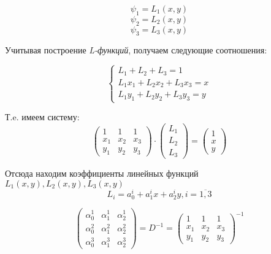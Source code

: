 \documentclass[12pt,a4paper]{article}
\begin{document}
\[ \psi_1 = L_1(x,y) \]
\[ \psi_2 = L_2(x,y) \]
\[ \psi_3 = L_3(x,y) \]
\newpage

\noindent Учитывая построение \textit{L-функций},
получаем следующие соотношения:

\begin{equation*}
    \begin{cases}
        L_1 + L_2 + L_3 = 1          \\
        L_1x_1 + L_2x_2 + L_3x_3 = x \\
        L_1y_1 + L_2y_2 + L_3y_3 = y
    \end{cases}
\end{equation*}

\noindent Т.e. имеем систему:
\renewcommand{\arraystretch}{1.25}
\begin{equation*}
    \begin{pmatrix}
        1   & 1   & 1   \\
        x_1 & x_2 & x_3 \\
        y_1 & y_2 & y_3
    \end{pmatrix}
    \cdot
    \begin{pmatrix}
        L_1 \\
        L_2 \\
        L_3
    \end{pmatrix}
    =
    \begin{pmatrix}
        1 \\
        x \\
        y
    \end{pmatrix}
\end{equation*}
\renewcommand{\arraystretch}{1.0}

\noindent Отсюда находим коэффициенты
линейных функций $L_1(x,y), L_2(x,y), L_3(x,y)$
\[ L_i = a_0^i + a_1^ix + a_2^iy, i = \overline{1,3} \]

\renewcommand{\arraystretch}{1.25}
\begin{equation*}
    \begin{pmatrix}
        \alpha_0^1 & \alpha_1^1 & \alpha_2^1 \\
        \alpha_0^2 & \alpha_1^2 & \alpha_2^2 \\
        \alpha_0^3 & \alpha_1^3 & \alpha_2^3
    \end{pmatrix}
    =
    D^{-1}
    =
    {\begin{pmatrix}
        1   & 1   & 1   \\
        x_1 & x_2 & x_3 \\
        y_1 & y_2 & y_3
    \end{pmatrix}}^{-1}
\end{equation*}
\renewcommand{\arraystretch}{1.0}
\end{document}
